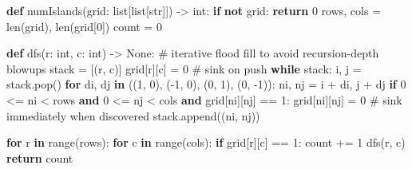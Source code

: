 \documentclass[11pt]{article}
\newenvironment{Shaded}{\begin{snugshade}}{\end{snugshade}}
\newcommand{\BuiltInTok}[1]{\textcolor[rgb]{0.50,0.55,0.55}{#1}}
\newcommand{\CommentTok}[1]{\textcolor[rgb]{0.48,0.49,0.49}{#1}}
\newcommand{\ControlFlowTok}[1]{\textcolor[rgb]{0.99,0.74,0.29}{\textbf{#1}}}
\newcommand{\DecValTok}[1]{\textcolor[rgb]{0.96,0.45,0.00}{#1}}
\newcommand{\KeywordTok}[1]{\textcolor[rgb]{0.81,0.81,0.76}{\textbf{#1}}}
\newcommand{\NormalTok}[1]{\textcolor[rgb]{0.81,0.81,0.76}{#1}}
\newcommand{\OperatorTok}[1]{\textcolor[rgb]{0.81,0.81,0.76}{#1}}
\newcommand{\StringTok}[1]{\textcolor[rgb]{0.96,0.31,0.31}{#1}}
\newcommand{\VariableTok}[1]{\textcolor[rgb]{0.15,0.68,0.68}{#1}}
\begin{document}
\begin{Shaded}
\begin{Highlighting}[]
\KeywordTok{def}\NormalTok{ numIslands(grid: }\BuiltInTok{list}\NormalTok{[}\BuiltInTok{list}\NormalTok{[}\BuiltInTok{str}\NormalTok{]]) }\OperatorTok{{-}\textgreater{}} \BuiltInTok{int}\NormalTok{:}
    \ControlFlowTok{if} \KeywordTok{not}\NormalTok{ grid:}
        \ControlFlowTok{return} \DecValTok{0}
\NormalTok{    rows, cols }\OperatorTok{=} \BuiltInTok{len}\NormalTok{(grid), }\BuiltInTok{len}\NormalTok{(grid[}\DecValTok{0}\NormalTok{])}
\NormalTok{    count }\OperatorTok{=} \DecValTok{0}

    \KeywordTok{def}\NormalTok{ dfs(r: }\BuiltInTok{int}\NormalTok{, c: }\BuiltInTok{int}\NormalTok{) }\OperatorTok{{-}\textgreater{}} \VariableTok{None}\NormalTok{:}
        \CommentTok{\# iterative flood fill to avoid recursion{-}depth blowups}
\NormalTok{        stack }\OperatorTok{=}\NormalTok{ [(r, c)]}
\NormalTok{        grid[r][c] }\OperatorTok{=} \StringTok{\textquotesingle{}0\textquotesingle{}}  \CommentTok{\# sink on push}
        \ControlFlowTok{while}\NormalTok{ stack:}
\NormalTok{            i, j }\OperatorTok{=}\NormalTok{ stack.pop()}
            \ControlFlowTok{for}\NormalTok{ di, dj }\KeywordTok{in}\NormalTok{ ((}\DecValTok{1}\NormalTok{, }\DecValTok{0}\NormalTok{), (}\OperatorTok{{-}}\DecValTok{1}\NormalTok{, }\DecValTok{0}\NormalTok{), (}\DecValTok{0}\NormalTok{, }\DecValTok{1}\NormalTok{), (}\DecValTok{0}\NormalTok{, }\OperatorTok{{-}}\DecValTok{1}\NormalTok{)):}
\NormalTok{                ni, nj }\OperatorTok{=}\NormalTok{ i }\OperatorTok{+}\NormalTok{ di, j }\OperatorTok{+}\NormalTok{ dj}
                \ControlFlowTok{if} \DecValTok{0} \OperatorTok{\textless{}=}\NormalTok{ ni }\OperatorTok{\textless{}}\NormalTok{ rows }\KeywordTok{and} \DecValTok{0} \OperatorTok{\textless{}=}\NormalTok{ nj }\OperatorTok{\textless{}}\NormalTok{ cols }\KeywordTok{and}\NormalTok{ grid[ni][nj] }\OperatorTok{==} \StringTok{\textquotesingle{}1\textquotesingle{}}\NormalTok{:}
\NormalTok{                    grid[ni][nj] }\OperatorTok{=} \StringTok{\textquotesingle{}0\textquotesingle{}}  \CommentTok{\# sink immediately when discovered}
\NormalTok{                    stack.append((ni, nj))}

    \ControlFlowTok{for}\NormalTok{ r }\KeywordTok{in} \BuiltInTok{range}\NormalTok{(rows):}
        \ControlFlowTok{for}\NormalTok{ c }\KeywordTok{in} \BuiltInTok{range}\NormalTok{(cols):}
            \ControlFlowTok{if}\NormalTok{ grid[r][c] }\OperatorTok{==} \StringTok{\textquotesingle{}1\textquotesingle{}}\NormalTok{:}
\NormalTok{                count }\OperatorTok{+=} \DecValTok{1}
\NormalTok{                dfs(r, c)}
    \ControlFlowTok{return}\NormalTok{ count}
\end{Highlighting}
\end{Shaded}
\end{document}
